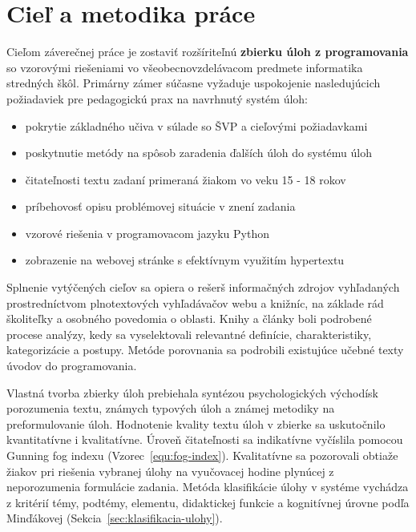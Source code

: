 \chapter{Cieľ a metodika práce}
Cieľom záverečnej práce je zostaviť rozšíriteľnú \textbf{zbierku úloh z programovania} so vzorovými riešeniami vo všeobecnovzdelávacom predmete informatika stredných škôl. Primárny zámer súčasne vyžaduje uspokojenie nasledujúcich požiadaviek pre pedagogickú prax na navrhnutý systém úloh:

\begin{itemize}[noitemsep]
\item pokrytie základného učiva v súlade so ŠVP a cieľovými požiadavkami
\item poskytnutie metódy na spôsob zaradenia ďalších úloh do systému úloh
\item čitateľnosti textu zadaní primeraná žiakom vo veku 15 - 18 rokov
\item príbehovosť opisu problémovej situácie v znení zadania
\item vzorové riešenia v programovacom jazyku Python
\item zobrazenie na webovej stránke s efektívnym využitím hypertextu
\end{itemize}

Splnenie vytýčených cieľov sa opiera o rešerš informačných zdrojov vyhľadaných prostredníctvom plnotextových vyhľadávačov webu a knižníc, na základe rád školiteľky a osobného povedomia o oblasti. Knihy a články boli podrobené procese analýzy, kedy sa vyselektovali relevantné definície, charakteristiky, kategorizácie a postupy. Metóde porovnania sa podrobili existujúce učebné texty úvodov do programovania.

Vlastná tvorba zbierky úloh prebiehala syntézou psychologických východísk porozumenia textu, známych typových úloh a známej metodiky na preformulovanie úloh. Hodnotenie kvality textu úloh v zbierke sa uskutočnilo kvantitatívne i kvalitatívne. Úroveň čitateľnosti sa indikatívne vyčíslila pomocou Gunning fog indexu (Vzorec~\ref{equ:fog-index}). Kvalitatívne sa pozorovali obtiaže žiakov pri riešenia vybranej úlohy na vyučovacej hodine plynúcej z neporozumenia formulácie zadania. Metóda klasifikácie úlohy v systéme vychádza z kritérií témy, podtémy, elementu, didaktickej funkcie a kognitívnej úrovne podľa Minďákovej (Sekcia~\ref{sec:klasifikacia-ulohy}).
